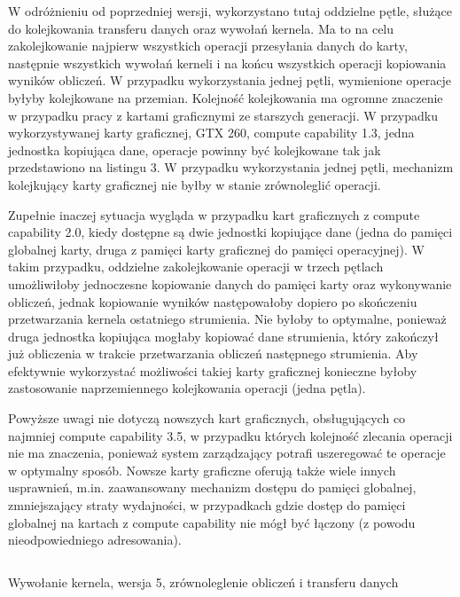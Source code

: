 \documentclass[12pt,a4paper]{article}
\begin{document}
W odróżnieniu od poprzedniej wersji, wykorzystano tutaj oddzielne pętle, służące do kolejkowania transferu danych oraz wywołań kernela. Ma to na celu zakolejkowanie najpierw wszystkich operacji przesyłania danych do karty, następnie wszystkich wywołań kerneli i na końcu wszystkich operacji kopiowania wyników obliczeń. W przypadku wykorzystania jednej pętli, wymienione operacje byłyby kolejkowane na przemian. Kolejność kolejkowania ma ogromne znaczenie w przypadku pracy z kartami graficznymi ze starszych generacji. W przypadku wykorzystywanej karty graficznej, GTX 260, compute capability 1.3, jedna jednostka kopiująca dane, operacje powinny być kolejkowane tak jak przedstawiono na listingu 3. W przypadku wykorzystania jednej pętli, mechanizm kolejkujący karty graficznej nie byłby w stanie zrównoleglić operacji.

Zupełnie inaczej sytuacja wygląda w przypadku kart graficznych z compute capability 2.0, kiedy dostępne są dwie jednostki kopiujące dane (jedna do pamięci globalnej karty, druga z pamięci karty graficznej do pamięci operacyjnej). W takim przypadku, oddzielne zakolejkowanie operacji w trzech pętlach umożliwiłoby jednoczesne kopiowanie danych do pamięci karty oraz wykonywanie obliczeń, jednak kopiowanie wyników następowałoby dopiero po skończeniu przetwarzania kernela ostatniego strumienia. Nie byłoby to optymalne, ponieważ druga jednostka kopiująca mogłaby kopiować dane strumienia, który zakończył już obliczenia w trakcie przetwarzania obliczeń następnego strumienia. Aby efektywnie wykorzystać możliwości takiej karty graficznej konieczne byłoby zastosowanie naprzemiennego kolejkowania operacji (jedna pętla).

Powyższe uwagi nie dotyczą nowszych kart graficznych, obsługujących co najmniej compute capability 3.5, w przypadku których kolejność zlecania operacji nie ma znaczenia, ponieważ system zarządzający potrafi uszeregować te operacje w optymalny sposób. Nowsze karty graficzne oferują także wiele innych usprawnień, m.in. zaawansowany mechanizm dostępu do pamięci globalnej, zmniejszający straty wydajności, w przypadkach gdzie dostęp do pamięci globalnej na kartach z compute capability nie mógł być łączony (z powodu nieodpowiedniego adresowania).


\begin{listing}[H]
\inputminted{cuda}{listings/invocation_async.cu}
\caption{Wywołanie kernela, wersja 5, zrównoleglenie obliczeń i transferu danych}
\label{lst:async}
\end{listing}
\end{document}
